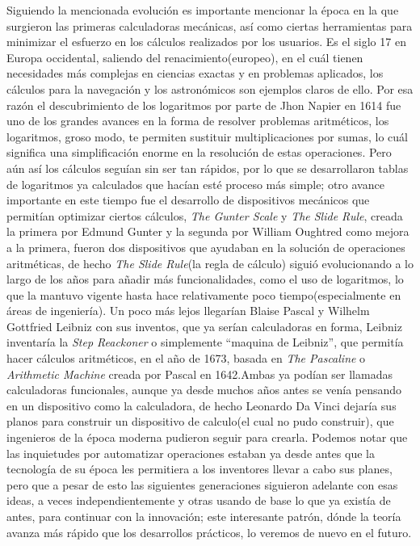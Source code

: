 \documentclass[letterpaper,12pt,oneside]{book}
\begin{document}
		Siguiendo la mencionada evolución es importante mencionar la época en la que surgieron las primeras calculadoras mecánicas, así
		como ciertas herramientas para minimizar el esfuerzo en los cálculos realizados por los usuarios. Es el siglo 17 en Europa occidental,
		saliendo del renacimiento(europeo), en el cuál tienen necesidades más complejas en ciencias exactas y en problemas aplicados, los
		cálculos para la navegación y los astronómicos son ejemplos claros de ello. Por esa razón el descubrimiento de
		los logaritmos por parte de Jhon Napier en 1614 fue uno de los grandes avances en la forma de resolver problemas aritméticos,
		los logaritmos, groso modo, te permiten sustituir multiplicaciones por sumas, lo cuál significa una simplificación enorme
		en la resolución de estas operaciones\cite[p. 24]{oregan_brief_2012}. Pero aún así los cálculos seguían sin ser tan rápidos,
		por lo que se desarrollaron tablas de logaritmos ya calculados que hacían esté proceso más simple; otro avance importante en este
		tiempo fue el desarrollo de dispositivos mecánicos que permitían optimizar ciertos cálculos, \textit{The Gunter Scale} y \textit{The Slide Rule},
		creada la primera por Edmund Gunter y la segunda por William Oughtred como mejora a la primera, fueron dos dispositivos que
		ayudaban en la solución de operaciones aritméticas, de hecho \textit{The Slide Rule}(la regla de cálculo) siguió evolucionando a lo largo de los años para añadir más
		funcionalidades, como el uso de logaritmos, lo que la mantuvo vigente hasta hace relativamente poco tiempo(especialmente en áreas de ingeniería)\cite[p.24 y p. 96]{oregan_brief_2012}.				
		 Un poco más lejos llegarían Blaise Pascal y Wilhelm Gottfried Leibniz con sus inventos, que ya serían calculadoras en forma, Leibniz inventaría la
		\textit{Step Reackoner} o simplemente ``maquina de Leibniz'', que permitía hacer cálculos aritméticos, en el año de 1673, basada en \textit{The Pascaline} o
		\textit{Arithmetic Machine} creada por Pascal en 1642\cite[p.25]{oregan_brief_2012}.Ambas ya podían ser llamadas calculadoras funcionales, aunque ya desde muchos años 
		antes se venía pensando
		en un dispositivo como la calculadora, de hecho Leonardo Da Vinci  dejaría sus planos para construir un dispositivo de calculo(el cual no pudo construir), que
		ingenieros de la época moderna pudieron seguir para crearla\cite{california_state_university_historical_nodate}.
		Podemos notar que las inquietudes por automatizar operaciones estaban
		ya desde antes que la tecnología de su época les permitiera a los inventores llevar a cabo sus planes, pero que a pesar de esto las siguientes
		generaciones siguieron adelante con esas ideas, a veces independientemente y otras usando de base lo que ya existía de antes, para
		continuar con la innovación; este interesante patrón, dónde la teoría avanza más rápido que los desarrollos prácticos, lo veremos de nuevo en el futuro.
		
\end{document}
